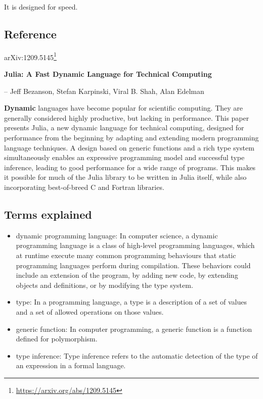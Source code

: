\documentclass[
  notoc %
]{tufte-book}
\DeclareRobustCommand{\href}[2]{#2\footnote{\url{#1}}}
\providecommand{\tightlist}{%
  \setlength{\itemsep}{0pt}\setlength{\parskip}{0pt}
}
\begin{document}
It is designed for speed.

\hypertarget{reference}{%
\subsection{Reference}\label{reference}}

\href{https://arxiv.org/abs/1209.5145}{arXiv:1209.5145}

\textbf{Julia: A Fast Dynamic Language for Technical Computing}

-- Jeff Bezanson, Stefan Karpinski, Viral B. Shah, Alan Edelman

\textbf{Dynamic} languages have become popular for scientific computing.
They are generally considered highly productive, but lacking in
performance. This paper presents Julia, a new dynamic language for
technical computing, designed for performance from the beginning by
adapting and extending modern programming language techniques. A design
based on generic functions and a rich type system simultaneously enables
an expressive programming model and successful type inference, leading
to good performance for a wide range of programs. This makes it possible
for much of the Julia library to be written in Julia itself, while also
incorporating best-of-breed C and Fortran libraries.

\hypertarget{terms-explained}{%
\subsection{Terms explained}\label{terms-explained}}

\begin{itemize}
\tightlist
\item
  dynamic programming language: In computer science, a dynamic
  programming language is a class of high-level programming languages,
  which at runtime execute many common programming behaviours that
  static programming languages perform during compilation. These
  behaviors could include an extension of the program, by adding new
  code, by extending objects and definitions, or by modifying the type
  system.
\item
  type: In a programming language, a type is a description of a set of
  values and a set of allowed operations on those values.
\item
  generic function: In computer programming, a generic function is a
  function defined for polymorphism.
\item
  type inference: Type inference refers to the automatic detection of
  the type of an expression in a formal language.
\end{itemize}
\end{document}
